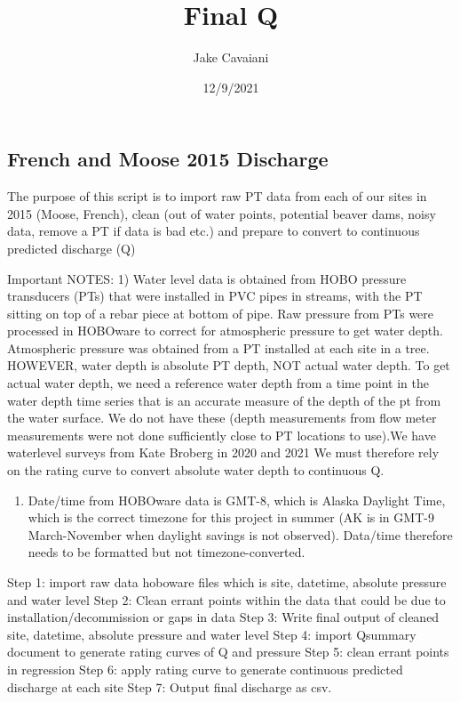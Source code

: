 \documentclass[
]{article}
\title{Final Q}
\author{Jake Cavaiani}
\date{12/9/2021}
\providecommand{\tightlist}{%
  \setlength{\itemsep}{0pt}\setlength{\parskip}{0pt}}
\begin{document}
\maketitle

\hypertarget{french-and-moose-2015-discharge}{%
\subsection{French and Moose 2015
Discharge}\label{french-and-moose-2015-discharge}}

The purpose of this script is to import raw PT data from each of our
sites in 2015 (Moose, French), clean (out of water points, potential
beaver dams, noisy data, remove a PT if data is bad etc.) and prepare to
convert to continuous predicted discharge (Q)

Important NOTES: 1) Water level data is obtained from HOBO pressure
transducers (PTs) that were installed in PVC pipes in streams, with the
PT sitting on top of a rebar piece at bottom of pipe. Raw pressure from
PTs were processed in HOBOware to correct for atmospheric pressure to
get water depth. Atmospheric pressure was obtained from a PT installed
at each site in a tree. HOWEVER, water depth is absolute PT depth, NOT
actual water depth. To get actual water depth, we need a reference water
depth from a time point in the water depth time series that is an
accurate measure of the depth of the pt from the water surface. We do
not have these (depth measurements from flow meter measurements were not
done sufficiently close to PT locations to use).We have waterlevel
surveys from Kate Broberg in 2020 and 2021 We must therefore rely on the
rating curve to convert absolute water depth to continuous Q.

\begin{enumerate}
\def\labelenumi{\arabic{enumi})}
\setcounter{enumi}{1}
\tightlist
\item
  Date/time from HOBOware data is GMT-8, which is Alaska Daylight Time,
  which is the correct timezone for this project in summer (AK is in
  GMT-9 March-November when daylight savings is not observed). Data/time
  therefore needs to be formatted but not timezone-converted.
\end{enumerate}

Step 1: import raw data hoboware files which is site, datetime, absolute
pressure and water level Step 2: Clean errant points within the data
that could be due to installation/decommission or gaps in data Step 3:
Write final output of cleaned site, datetime, absolute pressure and
water level Step 4: import Qsummary document to generate rating curves
of Q and pressure Step 5: clean errant points in regression Step 6:
apply rating curve to generate continuous predicted discharge at each
site Step 7: Output final discharge as csv.
\end{document}
